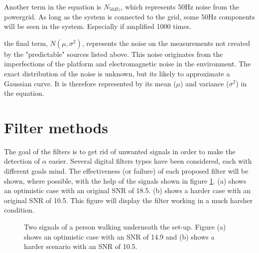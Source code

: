 Another term in the equation is $N_{50Hz}$, which represents 50Hz noise from the powergrid. As long as the system is connected to the grid, some 50Hz components will be seen in the system. Especially if amplified 1000 times.

the final term, $N(\mu,\sigma^2)$, represents the noise on the measurements not created by the "predictable" sources listed above. This noise originates from the imperfections of the platform and electromagnetic noise in the environment. The exact distribution of the noise is unknown, but its likely to approximate a Gaussian curve. It is therefore represented by its mean ($\mu$) and variance ($\sigma^2$) in the equation.

\section{Filter methods}
The goal of the filters is to get rid of unwanted signals in order to make the detection of $\alpha$ easier. Several digital filters types have been considered, each with different goals mind. The effectiveness (or failure) of each proposed filter will be shown, where possible, with the help of the signals shown in figure \ref{Original_signal}. (a) shows an optimistic case with an original SNR of 18.5. (b) shows a harder case with an original SNR of 10.5. This figure will display the filter working in a much harsher condition.

\begin{figure}
	\centering     %
	\caption{Two signals of a person walking underneath the set-up. Figure (a) shows an optimistic case with an SNR of 14.9 and (b) shows a harder scenario with an SNR of 10.5.\label{Original_signal}}
\end{figure}

